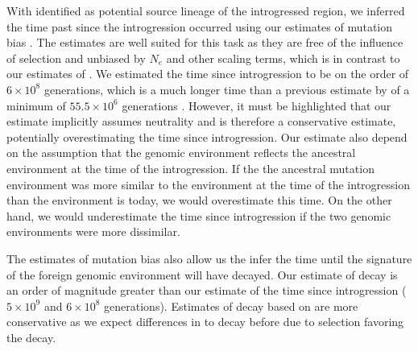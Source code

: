 \documentclass[12pt]{article}
\begin{document}
With \gossypii identified as potential source lineage of the introgressed region, we inferred the time past since the introgression occurred using our estimates of mutation bias \DM.
The \DM estimates are well suited for this task as they are free of the influence of selection and unbiased by $N_e$ and other scaling terms, which is in contrast to our estimates of \DE \citep{gilchrist2015}.
We estimated the time since introgression to be on the order of $6\times 10^8$ generations, which is a much longer time than a previous estimate by \citet{friedrich2015} of a minimum of $55.5\times 10^6$ generations .
However, it must be highlighted that our estimate implicitly assumes neutrality and is therefore a conservative estimate, potentially overestimating the time since introgression. 
Our estimate also depend on the assumption that the \gossypii genomic environment reflects the ancestral environment at the time of the introgression.
If the the ancestral mutation environment was more similar to the \kluyveri environment at the time of the introgression than the \gossypii environment is today, we would overestimate this time.
On the other hand, we would underestimate the time since introgression if the two genomic environments were more dissimilar.

The estimates of mutation bias \DM also allow us the infer the time until the signature of the foreign genomic environment will have decayed.
Our estimate of decay is an order of magnitude greater than our estimate of the time since introgression ($5\times 10^9$ and $6\times 10^8$ generations).
Estimates of decay based on \DM are more conservative as we expect differences in \DE to decay before due to selection favoring the decay.
 
\end{document}
